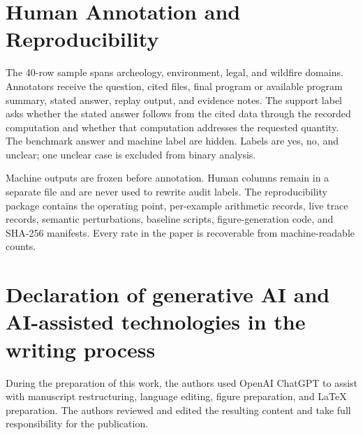 \documentclass[5p,times]{elsarticle}
\begin{document}
\section{Human Annotation and Reproducibility}\label{app:human}

The 40-row sample spans archeology, environment, legal, and wildfire domains. Annotators receive the question, cited files, final program or available program summary, stated answer, replay output, and evidence notes. The support label asks whether the stated answer follows from the cited data through the recorded computation and whether that computation addresses the requested quantity. The benchmark answer and machine label are hidden. Labels are yes, no, and unclear; one unclear case is excluded from binary analysis.

Machine outputs are frozen before annotation. Human columns remain in a separate file and are never used to rewrite audit labels. The reproducibility package contains the operating point, per-example arithmetic records, live trace records, semantic perturbations, baseline scripts, figure-generation code, and SHA-256 manifests. Every rate in the paper is recoverable from machine-readable counts.

\section*{Declaration of generative AI and AI-assisted technologies in the writing process}
During the preparation of this work, the authors used OpenAI ChatGPT to assist with manuscript restructuring, language editing, figure preparation, and LaTeX preparation. The authors reviewed and edited the resulting content and take full responsibility for the publication.



\end{document}
